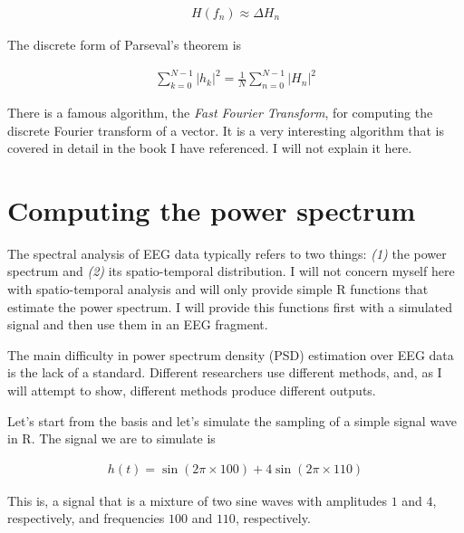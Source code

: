 \documentclass[a4paper, 12pt]{article}
\begin{document}
\begin{align*}
    H(f_n) \approx \Delta H_n
\end{align*}

The discrete form of Parseval's theorem is 

\begin{align*}
    \sum_{k=0}^{N-1} |h_k|^2 = \frac{1}{N} \sum_{n=0}^{N-1} |H_n|^2
\end{align*}

There is a famous algorithm, the \textit{Fast Fourier Transform}, for computing
the discrete Fourier transform of a vector. It is a very interesting algorithm
that is covered in detail in the book I have referenced. I will not explain it
here.


\section{Computing the power spectrum}

The spectral analysis of EEG data typically refers to two things: \textit{(1)}
the power spectrum and \textit{(2)} its spatio-temporal distribution. I will
not concern myself here with spatio-temporal analysis and will only provide
simple R functions that estimate the power spectrum. I will provide this
functions first with a simulated signal and then use them in an EEG fragment.

The main difficulty in power spectrum density (PSD) estimation over EEG data 
is the lack of a standard. Different researchers use different methods, and, 
as I will attempt to show, different methods produce different outputs. 

Let's start from the basis and let's simulate the sampling of a simple signal
wave in R. The signal we are to simulate is 

\begin{align*}
    h(t) = \sin(2\pi \times 100) + 4 \sin(2 \pi \times 110)
\end{align*}

This is, a signal that is a mixture of two sine waves with amplitudes $1$ and
$4$, respectively, and frequencies $100$ and $110$, respectively.
\end{document}
